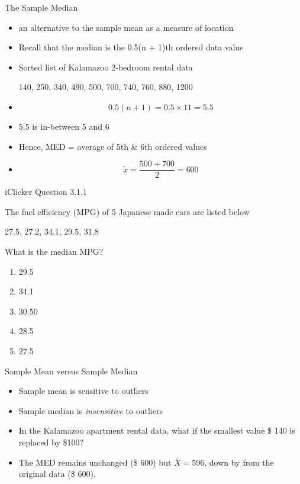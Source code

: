 \documentclass[14pt]{beamer}\usepackage[]{graphicx}\usepackage[]{color}
\begin{document}
\begin{frame}[fragile]{The Sample Median}



{\footnotesize{
\begin{itemize}
\item<1-> an alternative to the sample mean as a measure of location

\item<1-> Recall that the median is the 0.5(n + 1)th ordered data value

\item<1-> Sorted list of Kalamazoo 2-bedroom rental data

\vspace{3mm}

140, 250, 340, 490, 500, 700, 740, 760, 880, 1200
\item<2->
\begin{equation*}
0.5(n + 1) = 0.5 \times 11 = 5.5
\end{equation*}

\item<3-> 5.5 is in-between 5 and 6
\item<4-> Hence, MED = average of 5th \& 6th ordered values
\item<5->
\begin{equation*}
\tilde{x} = \frac{ 500 + 700 }{2} = 600
\end{equation*}
\end{itemize}
}}
\end{frame}

\begin{frame}[fragile]{iClicker Question 3.1.1}


The fuel efficiency (MPG) of 5 Japanese made cars are listed below

\begin{center}
27.5, 27.2, 34.1, 29.5, 31.8
\end{center}

What is the median MPG?

\begin{enumerate}
\item 29.5
\item 34.1
\item 30.50
\item 28.5
\item 27.5
\end{enumerate}
\end{frame}

\begin{frame}[fragile]{Sample Mean versus Sample Median}

\begin{itemize}
\item<1-> Sample mean is sensitive to outliers
\item<2-> Sample median is \textit{insensitive} to outliers
\item<3-> In the Kalamazoo apartment rental data, what if the smallest value \$ 140 is replaced by \$100?
\item<4-> The MED remains unchanged (\$ 600) but $\bar{X} = 596$, down by from the original data (\$ 600).
\end{itemize}
\end{frame}
\end{document}
